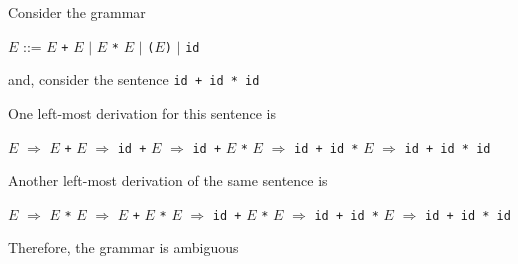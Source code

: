 \documentclass[8pt,a4paper,compress,handout]{beamer}
\newcommand{\mm}[1]{$#1$}
\newenvironment{spaced}
{
\smallskip
\hspace{.5cm}
\begin{minipage}[c]{\textwidth}
}
{
\end{minipage}
\smallskip
}
\begin{document}
\begin{frame}[fragile]
\pause

Consider the grammar

\text{ }
\begin{spaced}
\begin{production}
\mm{E} ::= \mm{E} \lstinline{+} \mm{E} \mm{|} \mm{E} \lstinline{*} \mm{E} \mm{|} \lstinline{(}\mm{E}\lstinline{)} \mm{|} \lstinline{id}
\end{production}
\end{spaced}

\noindent and, consider the sentence \lstinline{id + id * id}

\pause
\bigskip

One left-most derivation for this sentence is

\text{ }
\begin{spaced}
\begin{production}
\underline{\mm{E}} \mm{\Rightarrow} \underline{\mm{E}} \lstinline{+} \mm{E}
   \mm{\Rightarrow} \lstinline{id +} \underline{\mm{E}}
   \mm{\Rightarrow} \lstinline{id +} \underline{\mm{E}} \lstinline{*} \mm{E}
   \mm{\Rightarrow} \lstinline{id + id *} \underline{\mm{E}}
   \mm{\Rightarrow} \lstinline{id + id * id}
\end{production}
\end{spaced}

\pause
\bigskip

Another left-most derivation of the same sentence is

\text{ }
\begin{spaced}
\begin{production}
\underline{\mm{E}} \mm{\Rightarrow} \underline{\mm{E}} \lstinline{*} \mm{E}
   \mm{\Rightarrow} \underline{\mm{E}} \lstinline{+} \mm{E} \lstinline{*} \mm{E}
   \mm{\Rightarrow} \lstinline{id +} \underline{\mm{E}} \lstinline{*} \mm{E}
   \mm{\Rightarrow} \lstinline{id + id *} \underline{\mm{E}}
   \mm{\Rightarrow} \lstinline{id + id * id}
\end{production}
\end{spaced}

\pause
\bigskip

Therefore, the grammar is ambiguous
\end{frame}
\end{document}
